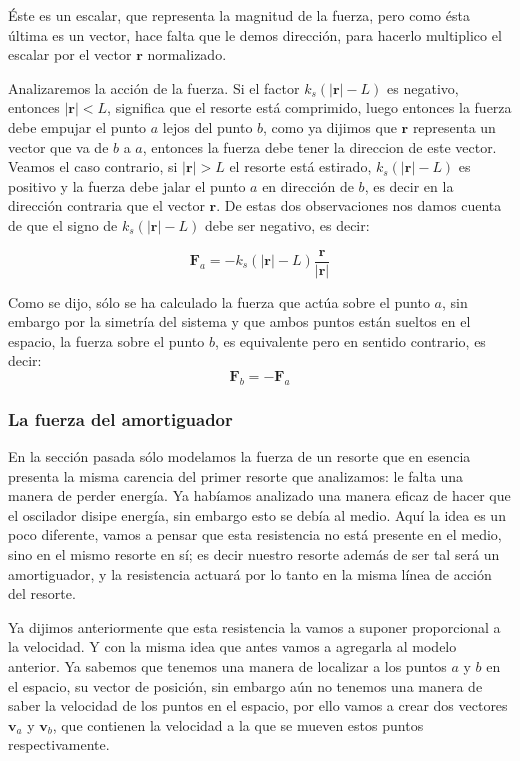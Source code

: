 Éste es un escalar, que representa la magnitud de la fuerza, pero como ésta última es un vector, hace falta que le demos dirección, para hacerlo multiplico el escalar por el vector $\textbf{r}$ normalizado.

Analizaremos la acción de la fuerza.
Si el factor $k_s \left( |\textbf{r}| - L \right)$ es negativo, entonces $| \textbf{r} | < L$, significa que el resorte está comprimido, luego entonces la fuerza debe empujar el punto $a$ lejos del punto $b$, como ya dijimos que $\textbf{r}$ representa un vector que va de $b$ a $a$, entonces la fuerza debe tener la direccion de este vector.
Veamos el caso contrario, si $ | \textbf{r} | > L $ el resorte está estirado, $k_s \left( |\textbf{r}| - L \right)$ es positivo y la fuerza debe jalar el punto $a$ en dirección de $b$, es decir en la dirección contraria que el vector $\textbf{r}$.
De estas dos observaciones nos damos cuenta de que el signo de $k_s \left( |\textbf{r}| - L \right)$ debe ser negativo, es decir:

\begin{equation}
\label{fuerza:resorte}
\textbf{F}_a = -k_s \left( |\textbf{r}| - L \right) \frac{\textbf{r}}{|\textbf{r}|}
\end{equation}

Como se dijo, sólo se ha calculado la fuerza que actúa sobre el punto $a$, sin embargo por la simetría del sistema y que ambos puntos están sueltos en el espacio, la fuerza sobre el punto $b$, es equivalente pero en sentido contrario, es decir:
$$ \textbf{F}_b = - \textbf{F}_a $$

\subsubsection{La fuerza del amortiguador}

En la sección pasada sólo modelamos la fuerza de un resorte que en esencia presenta la misma carencia del primer resorte que analizamos: le falta una manera de perder energía.
Ya habíamos analizado una manera eficaz de hacer que el oscilador disipe energía, sin embargo esto se debía al medio.
Aquí la idea es un poco diferente, vamos a pensar que esta resistencia no está presente en el medio, sino en el mismo resorte en sí; es decir nuestro resorte además de ser tal será un amortiguador, y la resistencia actuará por lo tanto en la misma línea de acción del resorte.

Ya dijimos anteriormente que esta resistencia la vamos a suponer proporcional a la velocidad.
Y con la misma idea que antes vamos a agregarla al modelo anterior.
Ya sabemos que tenemos una manera de localizar a los puntos $a$ y $b$ en el espacio, su vector de posición, sin embargo aún no tenemos una manera de saber la velocidad de los puntos en el espacio, por ello vamos a crear dos vectores $\textbf{v}_a$ y $\textbf{v}_b$, que contienen la velocidad a la que se mueven estos puntos respectivamente.

